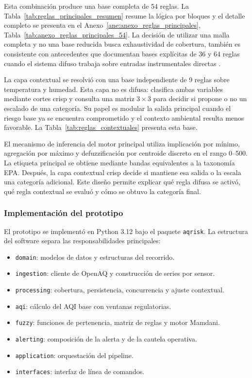 Esta combinación produce una base completa de 54 reglas. La Tabla~\ref{tab:reglas_principales_resumen} resume la lógica por bloques y el detalle completo se presenta en el Anexo~\ref{ane:anexo_reglas_principales}, Tabla~\ref{tab:anexo_reglas_principales_54}. La decisión de utilizar una malla completa y no una base reducida busca exhaustividad de cobertura, también es consistente con antecedentes que documentan bases explícitas de 36 y 64 reglas cuando el sistema difuso trabaja sobre entradas instrumentales directas \cite{A114,A165,A167}.



La capa contextual se resolvió con una base independiente de 9 reglas sobre temperatura y humedad. Esta capa no es difusa: clasifica ambas variables mediante cortes crisp y consulta una matriz \(3\times 3\) para decidir si propone o no un escalado de una categoría. Su papel es modular la salida principal cuando el riesgo base ya se encuentra comprometido y el contexto ambiental resulta menos favorable. La Tabla~\ref{tab:reglas_contextuales} presenta esta base.



El mecanismo de inferencia del motor principal utiliza implicación por mínimo, agregación por máximo y defuzzificación por centroide discreto en el rango 0--500. La etiqueta principal se obtiene mediante bandas equivalentes a la taxonomía EPA. Después, la capa contextual crisp decide si mantiene esa salida o la escala una categoría adicional. Este diseño permite explicar qué regla difusa se activó, qué regla contextual se evaluó y cómo se obtuvo la categoría final.

\subsubsection{Implementación del prototipo}
El prototipo se implementó en Python 3.12 bajo el paquete \texttt{aqrisk}. La estructura del software separa las responsabilidades principales:
\begin{itemize}
\item \texttt{domain}: modelos de datos y estructuras del recorrido.
\item \texttt{ingestion}: cliente de OpenAQ y construcción de series por sensor.
\item \texttt{processing}: cobertura, persistencia, concurrencia y ajuste contextual.
\item \texttt{aqi}: cálculo del AQI base con ventanas regulatorias.
\item \texttt{fuzzy}: funciones de pertenencia, matriz de reglas y motor Mamdani.
\item \texttt{alerting}: composición de la alerta y de la cautela operativa.
\item \texttt{application}: orquestación del pipeline.
\item \texttt{interfaces}: interfaz de línea de comandos.
\end{itemize}

